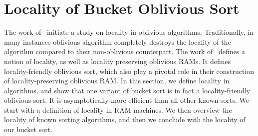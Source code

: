 
\section{Locality of Bucket Oblivious Sort}
\label{sec:locality}

The work of~\cite{AsharovCNPRS19} initiate a study on locality in oblivious algorithms. Traditionally, in many instances oblivious algorithm completely destroys the locality of the algorithm compared to their non-oblivious counterpart. The work of~\cite{AsharovCNPRS19} defines a notion of locality, as well as locality preserving oblivious RAMs. It defines locality-friendly oblivious sort, which also play a pivotal role in their construction of locality-preserving oblivious RAM. In this section, we define locality in algorithms, and show that one variant of bucket sort is in fact a locality-friendly oblivious sort. It is asymptotically more efficient than all other known sorts. We start with a definition of locality in RAM machines. We then overview the locality of known sorting algorithms, and then we conclude with the locality of our bucket sort. 






